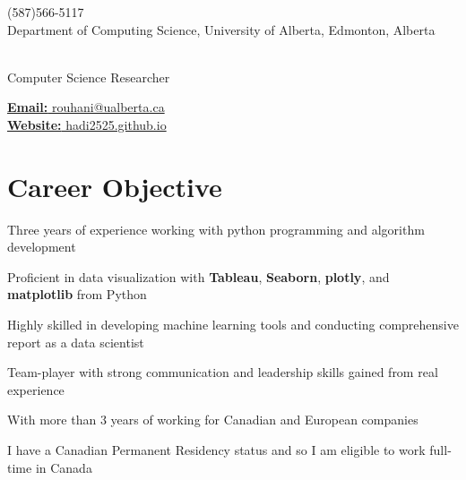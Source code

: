 \documentclass[letter,11pt]{article}
\author{Hadi Rohani} %
\makeatletter
\def\phone{(587)566-5117}
\def\city{Department of Computing Science, University of Alberta, Edmonton, Alberta}
\def\email{rouhani@ualberta.ca}
\def\Web{hadi2525.github.io}
\def\role{Computer Science Researcher} %
\makeatother
\begin{document}
\begin{center}
	\begin{minipage}[b]{.3\textwidth}
		\raggedright
		{\large \phone} \\ %
		{\city} %
		
	\end{minipage}%
	\begin{minipage}[b]{.4\textwidth}
		\makeatletter
		\centering {\HUGE \@author} \\
		\makeatother
		\vspace{.5em}
		{\color{highlight} \Large{\role}}
	\end{minipage}%
	\begin{minipage}[b]{.3\textwidth}
		\raggedleft 
		\href{mailto:\email}{\textbf{Email:} \email}\\ 
		\href{https://hadi2525.github.io/\Web}{\textbf{Website:} \Web}
	\end{minipage}

\end{center}
\vspace{-0.75em}	
\section{Career Objective}
\begin{zitemize}
	\item Three years of experience working with python programming and algorithm development
	\item Proficient in data visualization with \textbf{Tableau}, \textbf{Seaborn}, \textbf{plotly}, and \textbf{matplotlib} from Python
	\item Highly skilled in developing machine learning tools and conducting comprehensive report as a data scientist
	\item Team-player with strong communication and leadership skills gained from real experience
	\item With more than 3 years of working for Canadian and European companies
	\item I have a Canadian Permanent Residency status and so I am eligible to work full-time in Canada
\end{zitemize}
\end{document}
